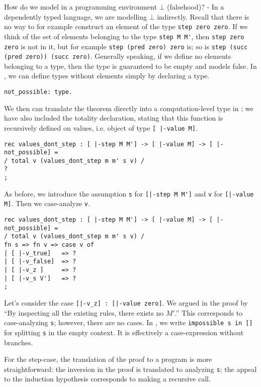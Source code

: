 How do we model in a programming environment $\bot$ (falsehood)? - In a
dependently typed language, we are modelling $\bot$ indirectly. Recall that
there is no way to for example construct an element of the type
\lstinline!step zero zero!.  If we think of the set of elements belonging to the type
\lstinline!step M M'!, then \lstinline!step zero zero! is not in it, but for
example \lstinline!step (pred zero) zero! is; so is
\lstinline!step (succ (pred zero)) (succ zero)!. Generally speaking, if we
define no elements
belonging to a type, then the type is guaranteed to be empty and models false.
In \beluga, we can define types without elements simply by declaring a type.

\begin{lstlisting}
not_possible: type.
\end{lstlisting}

We then can translate the theorem directly into a computation-level type in
\beluga; we have also included the totality declaration, stating that this
function is recursively defined on values, i.e. object of type \lstinline![ |-value M]!.

\begin{lstlisting}
rec values_dont_step : [ |-step M M'] -> [ |-value M] -> [ |-not_possible] =
/ total v (values_dont_step m m' s v) /
?
;
\end{lstlisting}

As before, we introduce the assumption \lstinline!s! for
\lstinline![|-step M M']! and \lstinline!v! for
\lstinline![|-value M]!. Then we case-analyze \lstinline!v!.

\begin{lstlisting}
rec values_dont_step : [ |-step M M'] -> [ |-value M] -> [ |-not_possible] =
/ total v (values_dont_step m m' s v) /
fn s => fn v => case v of
| [ |-v_true]   => ?
| [ |-v_false]  => ?
| [ |-v_z ]     => ?
| [ |-v_s V']   => ?
;
\end{lstlisting}

Let's consider the case \lstinline![|-v_z] : [|-value zero]!. We argued in the
proof by ``By inspecting all the existing rules, there exists no $M'$.'' This
corresponds to case-analyzing \lstinline!s!; however, there are no cases. In
\beluga, we write \lstinline!impossible s in []! for splitting \lstinline!s! in
the empty context. It is effectively a case-expression without branches.

For the step-case, the translation of the proof to a program is more
straightforward: the inversion in the proof is translated to analyzing
\lstinline!s!; the appeal to the induction hypothesis corresponds to making a
recursive call.

